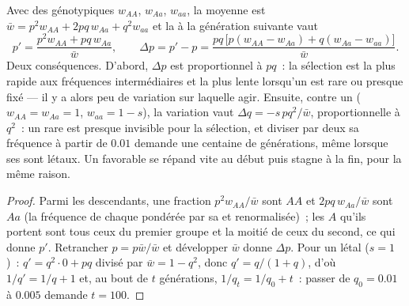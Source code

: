 \begin{theorem}\label{thm:b2:population-genetics:selection}
Avec des  génotypiques $w_{AA}$, $w_{Aa}$, $w_{aa}$, la
 moyenne est $\bar w = p^{2}w_{AA} + 2pq\,w_{Aa} + q^{2}w_{aa}$ et la
 à la génération suivante vaut
\[
p' = \frac{p^{2}w_{AA} + pq\,w_{Aa}}{\bar w}, \qquad
\Delta p = p' - p = \frac{pq\,\bigl[p(w_{AA} - w_{Aa}) + q(w_{Aa} - w_{aa})\bigr]}{\bar w}.
\]
Deux conséquences. D'abord, $\Delta p$ est proportionnel à $pq$~: la
sélection est la plus rapide aux fréquences intermédiaires et la plus
lente lorsqu'un  est rare ou presque fixé --- il y a alors peu de
variation sur laquelle agir.
Ensuite, contre un   ($w_{AA} = w_{Aa} = 1$, $w_{aa} =
1 - s$), la variation vaut $\Delta q = -s\,pq^{2}/\bar w$, proportionnelle
à $q^{2}$~: un  rare est presque invisible pour la sélection, et
diviser par deux sa fréquence à partir de $0.01$ demande une centaine de
générations, même lorsque ses  sont létaux. Un  
favorable se répand vite au début puis stagne à la fin, pour la même
raison.
\end{theorem}
\begin{proof}
Parmi les descendants, une fraction $p^{2}w_{AA}/\bar w$ sont $AA$ et
$2pq\,w_{Aa}/\bar w$ sont $Aa$ (la fréquence de chaque  pondérée
par sa  et renormalisée)~; les  $A$ qu'ils portent
sont tous ceux du premier groupe et la moitié de ceux du second, ce qui
donne $p'$. Retrancher $p =
p\bar w/\bar w$ et développer $\bar w$ donne $\Delta p$. Pour un 
létal ($s = 1$)~: $q' = q^{2}\cdot 0 + pq$ divisé par $\bar w = 1 -
q^{2}$, donc $q' = q/(1 + q)$, d'où $1/q' = 1/q + 1$ et, au bout de $t$
générations, $1/q_t = 1/q_0 + t$~: passer de $q_0 = 0.01$ à $0.005$ demande
$t = 100$.
\end{proof}

